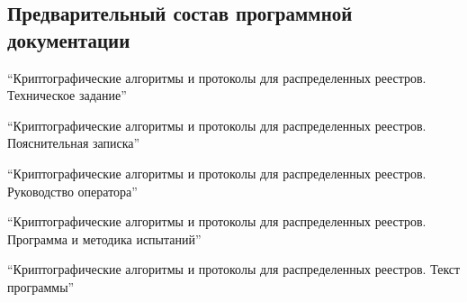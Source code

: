 \subsection{Предварительный состав программной документации}
\begin{my_enumerate}
    \item ``Криптографические алгоритмы и протоколы для распределенных реестров. Техническое 
    задание''
    \item ``Криптографические алгоритмы и протоколы для распределенных реестров. 
    Пояснительная записка''
    \item ``Криптографические алгоритмы и протоколы для распределенных реестров. 
    Руководство оператора''
    \item ``Криптографические алгоритмы и протоколы для распределенных реестров. Программа и 
    методика испытаний''
    \item ``Криптографические алгоритмы и протоколы для распределенных реестров. Текст 
    программы''
\end{my_enumerate}

